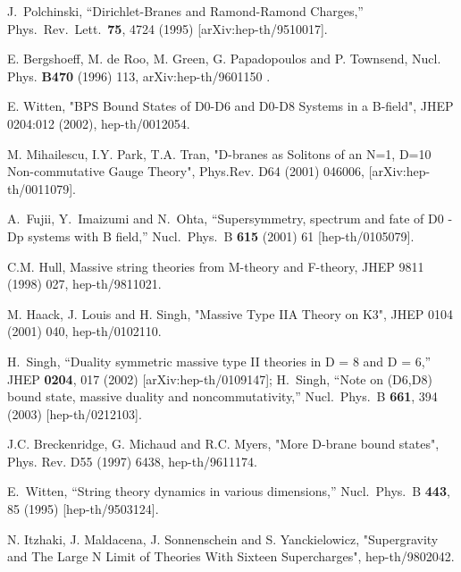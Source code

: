 \documentclass[12pt]{article}
\begin{document}
\begin{thebibliography}{99}
  J.~Polchinski,
  ``Dirichlet-Branes and Ramond-Ramond Charges,''
  Phys.\ Rev.\ Lett.\  {\bf 75}, 4724 (1995)
  [arXiv:hep-th/9510017].


 E. Bergshoeff, M. de Roo, M. Green, G. Papadopoulos and P. 
Townsend, Nucl. Phys. {\bf B470} (1996) 113, arXiv:hep-th/9601150 .

 E. Witten, "BPS Bound States of D0-D6 and D0-D8 Systems in a
B-field",  JHEP 0204:012 (2002), hep-th/0012054.

M. Mihailescu, I.Y. Park, T.A. Tran, 
"D-branes as Solitons of an N=1, D=10 Non-commutative Gauge Theory",
Phys.Rev. D64 (2001) 046006, 
[arXiv:hep-th/0011079].

A.~Fujii, Y.~Imaizumi and N.~Ohta,
   ``Supersymmetry, spectrum and fate of D0 - Dp systems with B field,''
   Nucl.\ Phys.\ B {\bf 615} (2001) 61
   [hep-th/0105079].

 C.M. Hull,
Massive string theories from M-theory and F-theory, JHEP 9811 (1998) 027,
hep-th/9811021.


 M. Haack, J. Louis and H. Singh, "Massive Type IIA Theory on K3",  JHEP 0104 (2001) 040,
hep-th/0102110.


 H.~Singh,
  ``Duality symmetric massive type II theories in D = 8 and D = 6,''
  JHEP {\bf 0204}, 017 (2002)
  [arXiv:hep-th/0109147];
  H.~Singh,
  ``Note on (D6,D8) bound state, massive duality and noncommutativity,''
  Nucl.\ Phys.\ B {\bf 661}, 394 (2003)
  [hep-th/0212103].

 J.C. Breckenridge, G. Michaud and R.C. Myers,
"More D-brane bound states", 
Phys. Rev. D55 (1997) 6438,
hep-th/9611174.

     
  E.~Witten,
  ``String theory dynamics in various dimensions,''
  Nucl.\ Phys.\ B {\bf 443}, 85 (1995)
  [hep-th/9503124].

 N. Itzhaki, J. Maldacena, J. Sonnenschein and S. Yanckielowicz,
"Supergravity and The Large N Limit of Theories With Sixteen Supercharges",
hep-th/9802042.

\end{thebibliography}
\end{document}
